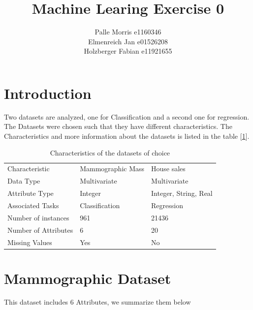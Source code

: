 \documentclass[11pt]{article}
\begin{document}
\graphicspath{{./figures/}}
\author{Palle Morris e1160346\\ Elmenreich Jan e01526208\\ Holzberger Fabian e11921655 }
\title{Machine Learing Exercise 0}
\maketitle

\medskip

\section{Introduction}
Two datasets are analyzed, one for Classification and a second one for regression. The Datasets were chosen such that they have different characteristics. The Characteristics and more information about the datasets is listed in the table [\ref{tab:char1}].
\begin{table}[H]
\begin{tabularx}{1.0\linewidth}{XXX}
\hline
Characteristic 		& Mammographic Mass 	& House sales   \\
Data Type 		& Multivariate 	& Multivariate \\
Attribute Type  	& Integer  & Integer, String, Real\\
Associated Tasks	& Classification & Regression \\
Number of instances     & 961 		 & 21436\\
Number of Attributes    & 6 		& 20\\
Missing Values 		& Yes 		& No \\
\hline
\end{tabularx}
\label{tab:char1}
\caption{Characteristics of the datasets of choice}
\end{table}



\section{Mammographic Dataset}
This dataset includes 6 Attributes, we summarize them below
\end{document}
